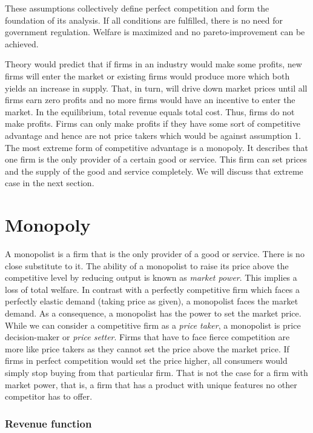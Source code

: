 \documentclass[
  12pt,
  oneside]{book}
\theoremstyle{definition}
\theoremstyle{definition}
\theoremstyle{definition}
\theoremstyle{definition}
\theoremstyle{remark}
\begin{document}
These assumptions collectively define perfect competition and form the foundation of its analysis. If all conditions are fulfilled, there is no need for government regulation. Welfare is maximized and no pareto-improvement can be achieved.

Theory would predict that if firms in an industry would make some profits, new firms will enter the market or existing firms would produce more which both yields an increase in supply. That, in turn, will drive down market prices until all firms earn zero profits and no more firms would have an incentive to enter the market. In the equilibrium, total revenue equals total cost. Thus, firms do not make profits. Firms can only make profits if they have some sort of competitive advantage and hence are not price takers which would be against assumption 1. The most extreme form of competitive advantage is a monopoly. It describes that one firm is the only provider of a certain good or service. This firm can set prices and the supply of the good and service completely. We will discuss that extreme case in the next section.

\section{Monopoly}\label{monopoly}

A monopolist is a firm that is the only provider of a good or service. There is no close substitute to it.
The ability of a monopolist to raise its price above the competitive level by reducing output is known as \emph{market power}. This implies a loss of total welfare.
In contrast with a perfectly competitive firm which faces a perfectly elastic demand (taking
price as given), a monopolist faces the market demand. As a consequence, a monopolist has the power to set the market price. While we can consider a
competitive firm as a \emph{price taker}, a monopolist is price decision-maker or \emph{price setter}.
Firms that have to face fierce competition are more like price takers as they cannot set the price above the market price. If firms in perfect competition would set the price higher, all consumers would simply stop buying from that particular firm. That is not the case for a firm with market power, that is, a firm that has a product with unique features no other competitor has to offer.

\subsubsection*{Revenue function}\label{revenue-function}
\end{document}
